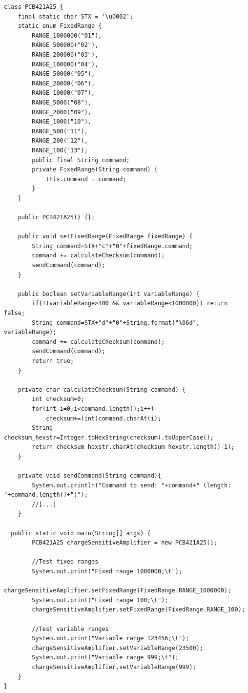 \begin{lstlisting}[style=java,caption = Java class of the PCB421A25 charge amplifier demonstrating the command structure and checksum calculation for integration of the amplifier into \gls{css}, label = lst:Appendix-javaPcb]
class PCB421A25 {
	final static char STX = '\u0002';	
	static enum FixedRange {
		RANGE_1000000("01"), 
		RANGE_500000("02"),
		RANGE_200000("03"),
		RANGE_100000("04"),
		RANGE_50000("05"),
		RANGE_20000("06"),
		RANGE_10000("07"),
		RANGE_5000("08"),
		RANGE_2000("09"),
		RANGE_1000("10"),
		RANGE_500("11"),
		RANGE_200("12"),
		RANGE_100("13");
		public final String command;
		private FixedRange(String command) {
			this.command = command;
		}
	}
	
	public PCB421A25() {};
	
	public void setFixedRange(FixedRange fixedRange) {
		String command=STX+"c"+"0"+fixedRange.command;
		command += calculateChecksum(command);
		sendCommand(command);
	}
	
	public boolean setVariableRange(int variableRange) {
		if(!(variableRange>100 && variableRange<1000000)) return false;
		String command=STX+"d"+"0"+String.format("%06d", variableRange);
		command += calculateChecksum(command);
		sendCommand(command);
		return true;
	}
	
	private char calculateChecksum(String command) {
		int checksum=0;
		for(int i=0;i<command.length();i++)
			checksum+=(int)command.charAt(i);
		String checksum_hexstr=Integer.toHexString(checksum).toUpperCase();
		return checksum_hexstr.charAt(checksum_hexstr.length()-1);
	}
	
	private void sendCommand(String command){
		System.out.println("Command to send: "+command+" (length: "+command.length()+")");
		//[...]
	}
	
  public static void main(String[] args) {
		PCB421A25 chargeSensitiveAmplifier = new PCB421A25();
		
		//Test fixed ranges
		System.out.print("Fixed range 1000000;\t");
		chargeSensitiveAmplifier.setFixedRange(FixedRange.RANGE_1000000);
        System.out.print("Fixed range 100;\t");
        chargeSensitiveAmplifier.setFixedRange(FixedRange.RANGE_100);
        
        //Test variable ranges
		System.out.print("Variable range 123456;\t");
		chargeSensitiveAmplifier.setVariableRange(23500);
		System.out.print("Variable range 999;\t");
		chargeSensitiveAmplifier.setVariableRange(999);
    }
}
\end{lstlisting}